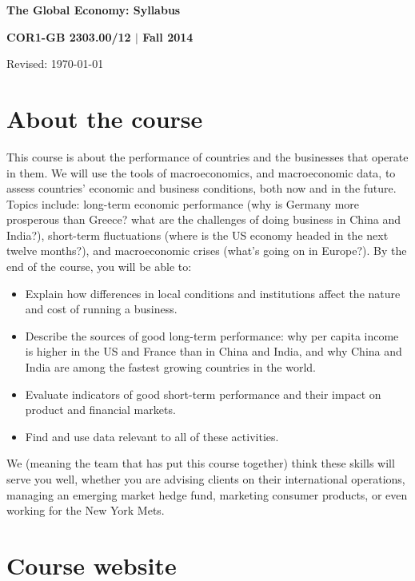 \documentclass[12pt]{article}
\begin{document}
\thispagestyle{empty}
\bigskipamount
\Head
\centerline{\large\bf The Global Economy:  Syllabus}
\vspace{1mm}
\centerline{\large\bf COR1-GB 2303.00/12 $|$ Fall 2014}
\vspace{1mm}
\centerline{Revised:  \today}

\section{About the course}

This course is about the performance of countries and
the businesses that operate in them.
We will use the tools of macroeconomics, and macroeconomic data,
to assess countries' economic and business conditions, both now and in the future.
Topics include:  long-term economic performance (why is Germany more prosperous than Greece? what are the challenges of doing business in China and India?), short-term fluctuations (where is the US economy headed in the next twelve months?), and macroeconomic crises (what's going on in Europe?).
By the end of the course, you will be able to:
%
\begin{itemize}
\item Explain how differences in local conditions
and institutions
affect the nature and cost of running a business.

\item Describe the sources of good long-term performance: why per
capita income is higher in the US and France than in China and India,
and why China and India are among the fastest growing countries in the
world.

\item Evaluate indicators of good short-term performance
and their impact on product and financial markets.


\item Find and use data relevant to all of these activities.

\end{itemize}
%
We (meaning the team that has put this course together)
think these skills will serve you well, whether you are
advising clients on their international operations,
managing an emerging market hedge fund,
marketing consumer products,
or even working for the New York Mets.


\section{Course website}
\end{document}

